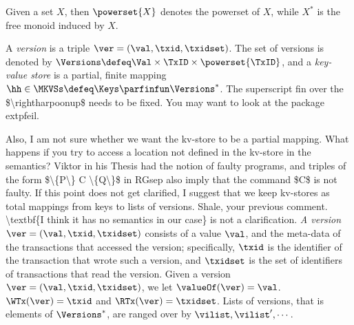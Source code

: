 Given a set $X$, then $\powerset{X}$ denotes 
the powerset of $X$, while $X^{\ast}$ is the free monoid induced by $X$.


\begin{definition}
\label{def:his_heap}
\label{def:mkvs}
A \emph{version} is a triple $\ver = (\val, \txid, \txidset)$. The set of versions is denoted by $\Versions \defeq \Val \times \TxID \times \powerset{\TxID}$, 
and a \emph{key-value store} is a partial, finite mapping $\hh \in \MKVSs \defeq \Keys \parfinfun \Versions^{\ast}$. 
\ac{ The superscript fin over the $\rightharpoonup$ needs to be fixed. You may want to look at the package extpfeil.}
\end{definition}
\ac{Also, I am not sure whether we want the kv-store to be a partial mapping. What happens if you try to access a location not 
defined in the kv-store in the semantics? Viktor in his Thesis had the notion of faulty programs, and triples of the form 
$\{P\} C \{Q\}$ in RGsep also imply that the command $C$ is not faulty. If this point  does not get clarified, 
I suggest that we keep kv-stores as total mappings from keys to lists of versions. Shale, 
your previous comment. \textbf{I think it has no semantics in our case} is not a clarification.}
\emph{A version} $\ver = (\val, \txid, \txidset)$ consists of a value $\val$, and the meta-data of the transactions 
that accessed the version; specifically, $\txid$ is the identifier of the transaction that wrote such a version, 
and $\txidset$ is the set of identifiers of transactions that read the version.
Given a version $\ver = (\val, \txid, \txidset)$, we let $\valueOf(\ver) = \val$. 
$\WTx(\ver) = \txid$ and $\RTx(\ver) = \txidset$.
Lists of versions, that is elements of $\Versions^{\ast}$, are ranged over by $\vilist, \vilist',\cdots$.

